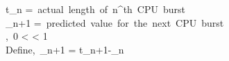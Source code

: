\documentclass{article}
\begin{document}
 
  t_{n} =\ actual\ length\ of\ n^{th}\ CPU\ burst\\
  
  \tau_{n+1} =\ predicted\ value\ for\ the\ next\ CPU\ burst\\
  
  \alpha,\ 0 < \alpha < 1\\
  
  Define,\ \tau_{n+1} = \alpha*t_{n}+1-\alpha*\tau_{n}\\
  
  
\end{document}
